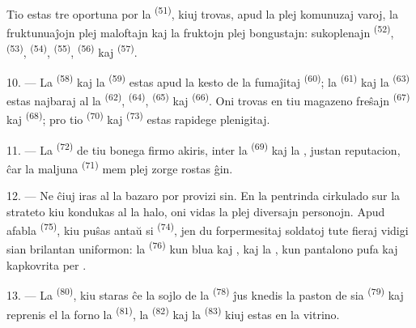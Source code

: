 Tio estas tre oportuna por la  \textsuperscript{(51)}, kiuj
trovas, apud la plej komunuzaj varoj, la fruktunuaĵojn plej maloftajn kaj la
fruktojn plej bongustajn: sukoplenajn  \textsuperscript{(52)},
 \textsuperscript{(53)}, 
\textsuperscript{(54)},  \textsuperscript{(55)},
 \textsuperscript{(56)} kaj 
\textsuperscript{(57)}.

\VUsaut{4.0mm}
\VUsaut{3.0mm}

10. --- La  \textsuperscript{(58)} kaj la 
\textsuperscript{(59)} estas apud la kesto de la fumaĵitaj 
\textsuperscript{(60)}; la  \textsuperscript{(61)} kaj la
 \textsuperscript{(63)} estas najbaraj al la 
\textsuperscript{(62)},  \textsuperscript{(64)},  \textsuperscript{(65)} kaj  \textsuperscript{(66)}. Oni
trovas en tiu magazeno freŝajn  \textsuperscript{(67)} kaj
 \textsuperscript{(68)}; pro tio 
\textsuperscript{(70)} kaj  \textsuperscript{(73)} estas
rapidege plenigitaj.

11. --- La  \textsuperscript{(72)} de tiu bonega firmo akiris,
inter la  \textsuperscript{(69)} kaj la
, justan reputacion, ĉar la maljuna 
\textsuperscript{(71)} mem plej zorge rostas ĝin.

\VUsaut{4.0mm}
\VUsaut{3.0mm}

12. --- Ne ĉiuj iras al la bazaro por provizi sin. En la pentrinda cirkulado
sur la strateto kiu kondukas al la halo, oni vidas la plej diversajn personojn.
Apud afabla  \textsuperscript{(75)}, kiu puŝas antaŭ si
 \textsuperscript{(74)}, jen du forpermesitaj soldatoj tute
fieraj vidigi sian brilantan uniformon: la 
\textsuperscript{(76)} kun blua  kaj , kaj
la , kun pantalono pufa kaj kapkovrita per .

13. --- La  \textsuperscript{(80)}, kiu staras ĉe la sojlo de la
 \textsuperscript{(78)} ĵus knedis la paston de sia 
\textsuperscript{(79)} kaj reprenis el la forno la 
\textsuperscript{(81)}, la  \textsuperscript{(82)} kaj la
 \textsuperscript{(83)} kiuj estas en la vitrino.

